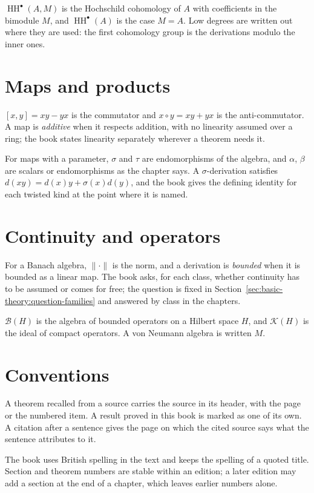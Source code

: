 $\operatorname{HH}^{\bullet}(A,M)$ is the Hochschild cohomology of $A$ with
coefficients in the bimodule $M$, and $\operatorname{HH}^{\bullet}(A)$ is the
case $M=A$.
Low degrees are written out where they are used: the first cohomology group is
the derivations modulo the inner ones.

\section*{Maps and products}

$[x,y]=xy-yx$ is the commutator and $x\circ y=xy+yx$ is the anti-commutator.
A map is \emph{additive} when it respects addition, with no linearity assumed
over a ring; the book states linearity separately wherever a theorem needs it. %

For maps with a parameter, $\sigma$ and $\tau$ are endomorphisms of the algebra,
and $\alpha$, $\beta$ are scalars or endomorphisms as the chapter says.
A $\sigma$-derivation satisfies $d(xy)=d(x)y+\sigma(x)d(y)$, and the book gives
the defining identity for each twisted kind at the point where it is named.

\section*{Continuity and operators}

For a Banach algebra, $\lVert\cdot\rVert$ is the norm, and a derivation is
\emph{bounded} when it is bounded as a linear map. %
The book asks, for each class, whether continuity has to be assumed or comes for
free; the question is fixed in
Section~\ref{sec:basic-theory:question-families} and answered by class in the
chapters.

$\mathcal{B}(H)$ is the algebra of bounded operators on a Hilbert space $H$, and
$\mathcal{K}(H)$ is the ideal of compact operators.
A von Neumann algebra is written $M$.

\section*{Conventions}

A theorem recalled from a source carries the source in its header, with the page
or the numbered item.
A result proved in this book is marked as one of its own.
A citation after a sentence gives the page on which the cited source says what
the sentence attributes to it.

The book uses British spelling in the text and keeps the spelling of a quoted
title.
Section and theorem numbers are stable within an edition; a later edition may
add a section at the end of a chapter, which leaves earlier numbers alone.
